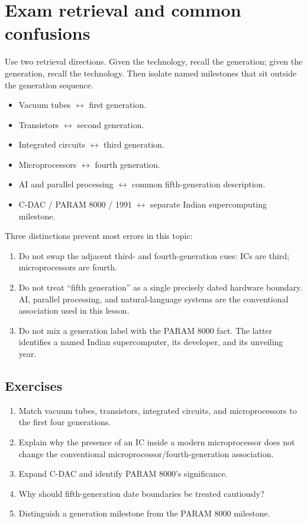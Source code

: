\section{Exam retrieval and common confusions}
Use two retrieval directions. Given the technology, recall the generation;
given the generation, recall the technology. Then isolate named milestones
that sit outside the generation sequence.
\begin{itemize}
  \item Vacuum tubes $\leftrightarrow$ first generation.
  \item Transistors $\leftrightarrow$ second generation.
  \item Integrated circuits $\leftrightarrow$ third generation.
  \item Microprocessors $\leftrightarrow$ fourth generation.
  \item AI and parallel processing $\leftrightarrow$ common fifth-generation
    description.
  \item C-DAC / PARAM 8000 / 1991 $\leftrightarrow$ separate Indian
    supercomputing milestone.
\end{itemize}

Three distinctions prevent most errors in this topic:
\begin{enumerate}
  \item Do not swap the adjacent third- and fourth-generation cues: ICs are
    third; microprocessors are fourth.
  \item Do not treat ``fifth generation'' as a single precisely dated
    hardware boundary. AI, parallel processing, and natural-language
    systems are the conventional association used in this lesson.
  \item Do not mix a generation label with the PARAM 8000 fact. The latter
    identifies a named Indian supercomputer, its developer, and its
    unveiling year.
\end{enumerate}

\subsection*{Exercises}
\begin{enumerate}[label=\arabic*.]
  \item Match vacuum tubes, transistors, integrated circuits, and
    microprocessors to the first four generations.
  \item Explain why the presence of an IC inside a modern microprocessor
    does not change the conventional microprocessor/fourth-generation
    association.
  \item Expand C-DAC and identify PARAM 8000's significance.
  \item Why should fifth-generation date boundaries be treated cautiously?
  \item Distinguish a generation milestone from the PARAM 8000 milestone.
\end{enumerate}

